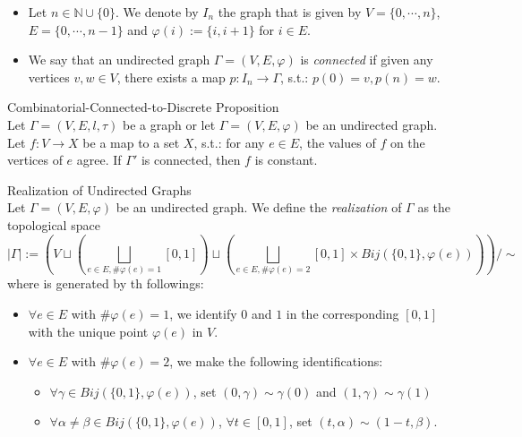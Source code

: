 \begin{definition}
    \begin{itemize}
        \item Let $n \in \mathbb{N} \cup\{0\}$. We denote by $I_n$ the graph that is given by $V=\{ 0,\cdots,n \}$, $E=\{0,\cdots, n-1\}$ and $\varphi(i) := \{i,i+1\}$ for $i \in E$.

        \item We say that an undirected graph $\Gamma= (V,E,\varphi)$ is \textit{connected} if given any vertices $v,w \in V$, there exists a map $p: I_n \to \Gamma$, s.t.: $p(0)=v,p(n)=w$.
    \end{itemize}
\end{definition}

\begin{proposition}{Combinatorial-Connected-to-Discrete Proposition}\\
Let $\Gamma= (V,E,l,\tau)$ be a graph or let $\Gamma= (V,E,\varphi)$ be an undirected graph. Let $f: V\to X$ be a map to a set $X$, s.t.: for any $e \in E$, the values of $f$ on the vertices of $e$ agree. If $\Gamma'$ is connected, then $f$ is constant.
\end{proposition}

\begin{definition}{Realization of Undirected Graphs}\\
Let $\Gamma=(V,E,\varphi)$ be an undirected graph. We define the \textit{realization} of $\Gamma$ as the topological space
$$|\Gamma| := (V \sqcup (\bigsqcup_{e\in E, \#\varphi(e)=1} [0,1]) \sqcup (\bigsqcup_{e\in E, \#\varphi(e)=2} [0,1] \times Bij(\{0,1\},\varphi(e)))) /\sim$$
where is generated by th followings:
\begin{itemize}
    \item $\forall e\in E$ with $\#\varphi (e)=1$, we identify $0$ and $1$ in the corresponding $[0,1]$ with the unique point $\varphi(e)$ in $V$.
    \item $\forall e \in E$ with $\#\varphi (e)=2$, we make the following identifications:
    \begin{itemize}
        \item $\forall \gamma \in Bij(\{0,1\} ,\varphi(e))$, set $(0, \gamma) \sim \gamma(0)$ and $(1,\gamma) \sim \gamma(1)$
        \item $\forall \alpha \neq \beta \in Bij(\{0,1\}, \varphi(e))$, $\forall t \in [0,1]$, set $(t,\alpha) \sim (1-t,\beta)$.
    \end{itemize}
\end{itemize}
\end{definition}

